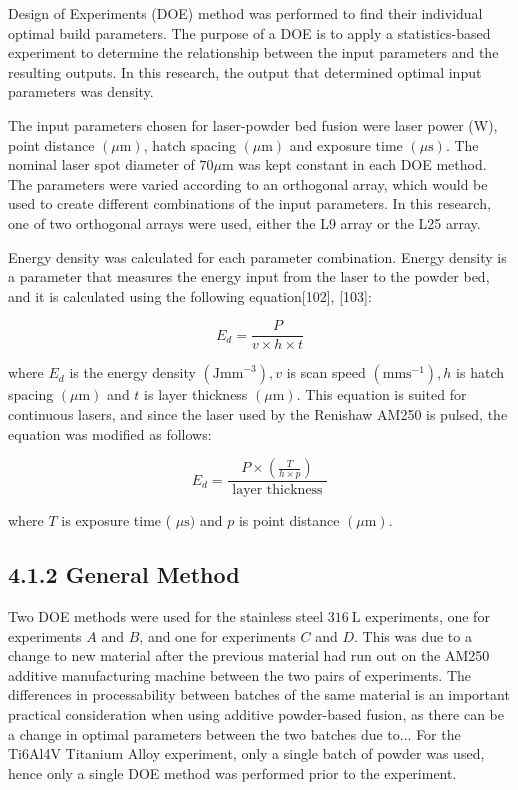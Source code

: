 \documentclass[10pt]{article}
\begin{document}
Design of Experiments (DOE) method was performed to find their individual optimal build parameters. The purpose of a DOE is to apply a statistics-based experiment to determine the relationship between the input parameters and the resulting outputs. In this research, the output that determined optimal input parameters was density.

The input parameters chosen for laser-powder bed fusion were laser power (W), point distance $(\mu \mathrm{m})$, hatch spacing $(\mu \mathrm{m})$ and exposure time $(\mu \mathrm{s})$. The nominal laser spot diameter of $70 \mu \mathrm{m}$ was kept constant in each DOE method. The parameters were varied according to an orthogonal array, which would be used to create different combinations of the input parameters. In this research, one of two orthogonal arrays were used, either the L9 array or the L25 array.

Energy density was calculated for each parameter combination. Energy density is a parameter that measures the energy input from the laser to the powder bed, and it is calculated using the following equation[102], [103]:


\begin{equation*}
E_{d}=\frac{P}{v \times h \times t} \tag{5}
\end{equation*}


where $E_{d}$ is the energy density $\left(\mathrm{Jmm}^{-3}\right), v$ is scan speed $\left(\mathrm{mms}^{-1}\right), h$ is hatch spacing $(\mu \mathrm{m})$ and $t$ is layer thickness $(\mu \mathrm{m})$. This equation is suited for continuous lasers, and since the laser used by the Renishaw AM250 is pulsed, the equation was modified as follows:


\begin{equation*}
E_{d}=\frac{P \times\left(\frac{T}{h \times p}\right)}{\text { layer thickness }} \tag{6}
\end{equation*}


where $T$ is exposure time ( $\mu \mathrm{s})$ and $p$ is point distance $(\mu \mathrm{m})$.

\subsection*{4.1.2 General Method}
Two DOE methods were used for the stainless steel $316 \mathrm{~L}$ experiments, one for experiments $A$ and $B$, and one for experiments $C$ and $D$. This was due to a change to new material after the previous material had run out on the AM250 additive manufacturing machine between the two pairs of experiments. The differences in processability between batches of the same material is an important practical consideration when using additive powder-based fusion, as there can be a change in optimal parameters between the two batches due to... For the Ti6Al4V Titanium Alloy experiment, only a single batch of powder was used, hence only a single DOE method was performed prior to the experiment.
\end{document}
